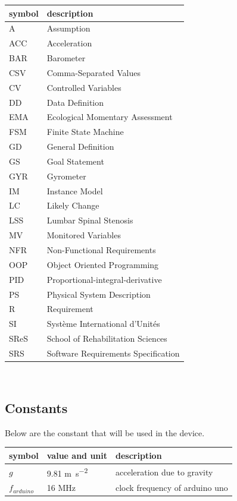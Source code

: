 \documentclass[12pt]{article}
\begin{document}
\begin{tabular}{l l} 
  \toprule		
  \textbf{symbol} & \textbf{description}\\
  \midrule 
  A & Assumption\\
  ACC & Acceleration\\
  BAR & Barometer\\
  CSV & Comma-Separated Values\\
  CV & Controlled Variables\\
  DD & Data Definition\\
  EMA & Ecological Momentary Assessment\\
  FSM & Finite State Machine\\
  GD & General Definition\\
  GS & Goal Statement\\
  GYR & Gyrometer\\
  IM & Instance Model\\
  LC & Likely Change\\
  LSS & Lumbar Spinal Stenosis\\
  MV & Monitored Variables\\
  NFR & Non-Functional Requirements\\
  OOP & Object Oriented Programming\\
  PID & Proportional-integral-derivative\\
  PS & Physical System Description\\
  R & Requirement\\
  SI & Syst\`{e}me International d'Unit\'{e}s\\
  SReS & School of Rehabilitation Sciences\\
  SRS & Software Requirements Specification\\

  \bottomrule
\end{tabular}\\


\subsection{Constants}
Below are the constant that will be used in the device.
\renewcommand{\arraystretch}{1.2}
\noindent \begin{longtable*}{l l p{12cm}} \toprule

\textbf{symbol} & \textbf{value and unit} & \textbf{description}\\
\midrule
$g$ & 9.81 \si{\metre\per\square\second} & acceleration due to gravity\\
$f_{arduino}$ &16 \si{MHz} & clock frequency of arduino uno\\
\bottomrule

\end{longtable*}
\end{document}
